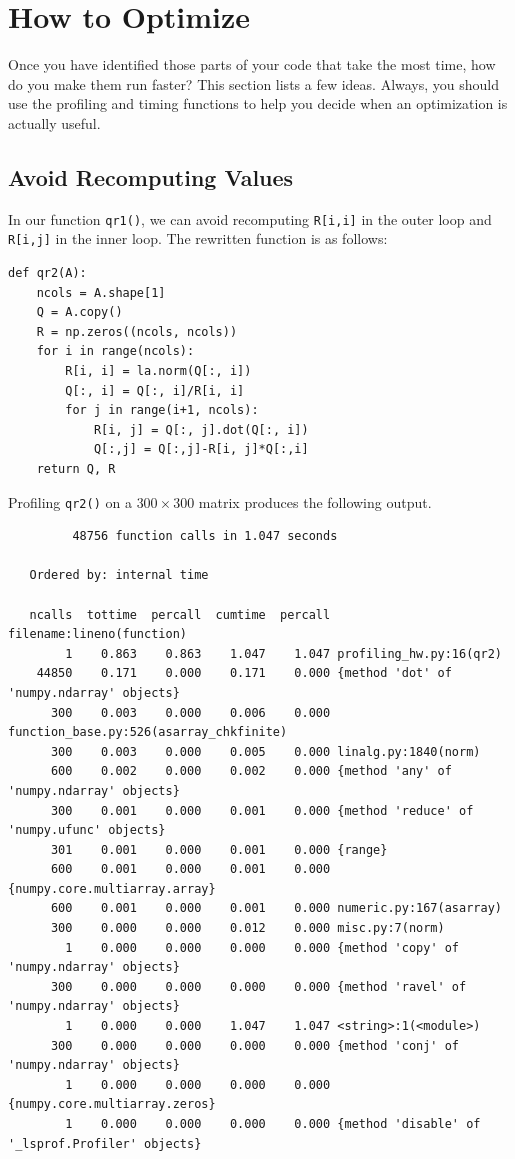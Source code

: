 \section*{How to Optimize}
Once you have identified those parts of your code that take the most time, how do you make them run faster?
This section lists a few ideas.
Always, you should use the profiling and timing functions to help you decide when an optimization is actually useful.

\subsection*{Avoid Recomputing Values}
In our function \texttt{qr1()}, we can avoid recomputing \texttt{R[i,i]} in the outer loop and \texttt{R[i,j]} in the inner loop.
The rewritten function is as follows:
\begin{lstlisting}
def qr2(A):
    ncols = A.shape[1]
    Q = A.copy()
    R = np.zeros((ncols, ncols))
    for i in range(ncols):
        R[i, i] = la.norm(Q[:, i])
        Q[:, i] = Q[:, i]/R[i, i]
        for j in range(i+1, ncols):
            R[i, j] = Q[:, j].dot(Q[:, i])
            Q[:,j] = Q[:,j]-R[i, j]*Q[:,i]
    return Q, R
\end{lstlisting}

Profiling \texttt{qr2()} on a $300 \times 300$ matrix produces the following output.

{\scriptsize
\begin{verbatim}
         48756 function calls in 1.047 seconds

   Ordered by: internal time

   ncalls  tottime  percall  cumtime  percall filename:lineno(function)
        1    0.863    0.863    1.047    1.047 profiling_hw.py:16(qr2)
    44850    0.171    0.000    0.171    0.000 {method 'dot' of 'numpy.ndarray' objects}
      300    0.003    0.000    0.006    0.000 function_base.py:526(asarray_chkfinite)
      300    0.003    0.000    0.005    0.000 linalg.py:1840(norm)
      600    0.002    0.000    0.002    0.000 {method 'any' of 'numpy.ndarray' objects}
      300    0.001    0.000    0.001    0.000 {method 'reduce' of 'numpy.ufunc' objects}
      301    0.001    0.000    0.001    0.000 {range}
      600    0.001    0.000    0.001    0.000 {numpy.core.multiarray.array}
      600    0.001    0.000    0.001    0.000 numeric.py:167(asarray)
      300    0.000    0.000    0.012    0.000 misc.py:7(norm)
        1    0.000    0.000    0.000    0.000 {method 'copy' of 'numpy.ndarray' objects}
      300    0.000    0.000    0.000    0.000 {method 'ravel' of 'numpy.ndarray' objects}
        1    0.000    0.000    1.047    1.047 <string>:1(<module>)
      300    0.000    0.000    0.000    0.000 {method 'conj' of 'numpy.ndarray' objects}
        1    0.000    0.000    0.000    0.000 {numpy.core.multiarray.zeros}
        1    0.000    0.000    0.000    0.000 {method 'disable' of '_lsprof.Profiler' objects}
\end{verbatim}
}


